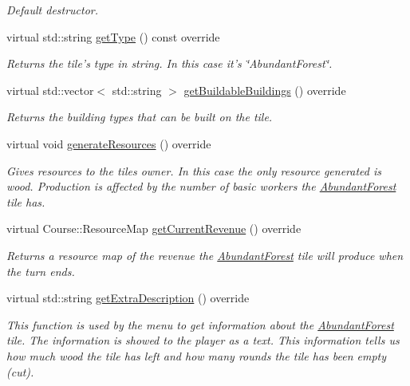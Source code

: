 \begin{DoxyCompactItemize}
\begin{DoxyCompactList}\small\item\em Default destructor. \end{DoxyCompactList}\item 
virtual std\-::string \hyperlink{class_student_1_1_abundant_forest_a716c3d8cbbaf27a19fb23d95e66405ff}{get\-Type} () const override
\begin{DoxyCompactList}\small\item\em Returns the tile's type in string. In this case it's \char`\"{}\-Abundant\-Forest\char`\"{}. \end{DoxyCompactList}\item 
virtual std\-::vector$<$ std\-::string $>$ \hyperlink{class_student_1_1_abundant_forest_a8a5b29d73c0e04ae739504ceaa3cde68}{get\-Buildable\-Buildings} () override
\begin{DoxyCompactList}\small\item\em Returns the building types that can be built on the tile. \end{DoxyCompactList}\item 
virtual void \hyperlink{class_student_1_1_abundant_forest_a3b7642f5862bc578c2e3bd77d217249a}{generate\-Resources} () override
\begin{DoxyCompactList}\small\item\em Gives resources to the tiles owner. In this case the only resource generated is wood. Production is affected by the number of basic workers the \hyperlink{class_student_1_1_abundant_forest}{Abundant\-Forest} tile has. \end{DoxyCompactList}\item 
virtual Course\-::\-Resource\-Map \hyperlink{class_student_1_1_abundant_forest_a7b8a905b899568e329d827f97f4a01b0}{get\-Current\-Revenue} () override
\begin{DoxyCompactList}\small\item\em Returns a resource map of the revenue the \hyperlink{class_student_1_1_abundant_forest}{Abundant\-Forest} tile will produce when the turn ends. \end{DoxyCompactList}\item 
virtual std\-::string \hyperlink{class_student_1_1_abundant_forest_a623cd1c6df889e3064a2dd212e5ea9ea}{get\-Extra\-Description} () override
\begin{DoxyCompactList}\small\item\em This function is used by the menu to get information about the \hyperlink{class_student_1_1_abundant_forest}{Abundant\-Forest} tile. The information is showed to the player as a text. This information tells us how much wood the tile has left and how many rounds the tile has been empty (cut). \end{DoxyCompactList}\end{DoxyCompactItemize}
